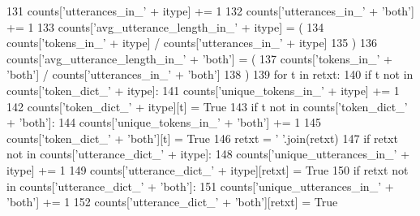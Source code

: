 \begin{DoxyCode}
131                 counts[\textcolor{stringliteral}{'utterances\_in\_'} + itype] += 1
132                 counts[\textcolor{stringliteral}{'utterances\_in\_'} + \textcolor{stringliteral}{'both'}] += 1
133                 counts[\textcolor{stringliteral}{'avg\_utterance\_length\_in\_'} + itype] = (
134                     counts[\textcolor{stringliteral}{'tokens\_in\_'} + itype] / counts[\textcolor{stringliteral}{'utterances\_in\_'} + itype]
135                 )
136                 counts[\textcolor{stringliteral}{'avg\_utterance\_length\_in\_'} + \textcolor{stringliteral}{'both'}] = (
137                     counts[\textcolor{stringliteral}{'tokens\_in\_'} + \textcolor{stringliteral}{'both'}] / counts[\textcolor{stringliteral}{'utterances\_in\_'} + \textcolor{stringliteral}{'both'}]
138                 )
139                 \textcolor{keywordflow}{for} t \textcolor{keywordflow}{in} retxt:
140                     \textcolor{keywordflow}{if} t \textcolor{keywordflow}{not} \textcolor{keywordflow}{in} counts[\textcolor{stringliteral}{'token\_dict\_'} + itype]:
141                         counts[\textcolor{stringliteral}{'unique\_tokens\_in\_'} + itype] += 1
142                         counts[\textcolor{stringliteral}{'token\_dict\_'} + itype][t] = \textcolor{keyword}{True}
143                     \textcolor{keywordflow}{if} t \textcolor{keywordflow}{not} \textcolor{keywordflow}{in} counts[\textcolor{stringliteral}{'token\_dict\_'} + \textcolor{stringliteral}{'both'}]:
144                         counts[\textcolor{stringliteral}{'unique\_tokens\_in\_'} + \textcolor{stringliteral}{'both'}] += 1
145                         counts[\textcolor{stringliteral}{'token\_dict\_'} + \textcolor{stringliteral}{'both'}][t] = \textcolor{keyword}{True}
146                 retxt = \textcolor{stringliteral}{' '}.join(retxt)
147                 \textcolor{keywordflow}{if} retxt \textcolor{keywordflow}{not} \textcolor{keywordflow}{in} counts[\textcolor{stringliteral}{'utterance\_dict\_'} + itype]:
148                     counts[\textcolor{stringliteral}{'unique\_utterances\_in\_'} + itype] += 1
149                     counts[\textcolor{stringliteral}{'utterance\_dict\_'} + itype][retxt] = \textcolor{keyword}{True}
150                 \textcolor{keywordflow}{if} retxt \textcolor{keywordflow}{not} \textcolor{keywordflow}{in} counts[\textcolor{stringliteral}{'utterance\_dict\_'} + \textcolor{stringliteral}{'both'}]:
151                     counts[\textcolor{stringliteral}{'unique\_utterances\_in\_'} + \textcolor{stringliteral}{'both'}] += 1
152                     counts[\textcolor{stringliteral}{'utterance\_dict\_'} + \textcolor{stringliteral}{'both'}][retxt] = \textcolor{keyword}{True}

\end{DoxyCode}
